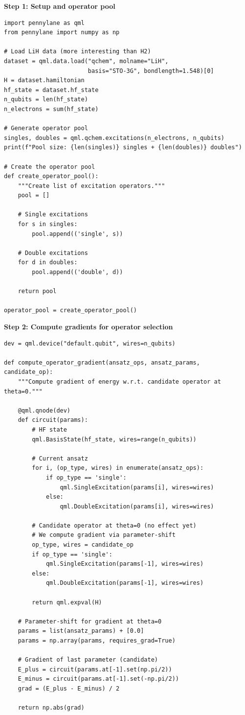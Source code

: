 \documentclass[11pt,a4paper]{article}
\begin{document}
\textbf{Step 1: Setup and operator pool}
\begin{lstlisting}
import pennylane as qml
from pennylane import numpy as np

# Load LiH data (more interesting than H2)
dataset = qml.data.load("qchem", molname="LiH",
                        basis="STO-3G", bondlength=1.548)[0]
H = dataset.hamiltonian
hf_state = dataset.hf_state
n_qubits = len(hf_state)
n_electrons = sum(hf_state)

# Generate operator pool
singles, doubles = qml.qchem.excitations(n_electrons, n_qubits)
print(f"Pool size: {len(singles)} singles + {len(doubles)} doubles")

# Create the operator pool
def create_operator_pool():
    """Create list of excitation operators."""
    pool = []
    
    # Single excitations
    for s in singles:
        pool.append(('single', s))
    
    # Double excitations
    for d in doubles:
        pool.append(('double', d))
    
    return pool

operator_pool = create_operator_pool()
\end{lstlisting}

\textbf{Step 2: Compute gradients for operator selection}
\begin{lstlisting}
dev = qml.device("default.qubit", wires=n_qubits)

def compute_operator_gradient(ansatz_ops, ansatz_params, candidate_op):
    """Compute gradient of energy w.r.t. candidate operator at theta=0."""
    
    @qml.qnode(dev)
    def circuit(params):
        # HF state
        qml.BasisState(hf_state, wires=range(n_qubits))
        
        # Current ansatz
        for i, (op_type, wires) in enumerate(ansatz_ops):
            if op_type == 'single':
                qml.SingleExcitation(params[i], wires=wires)
            else:
                qml.DoubleExcitation(params[i], wires=wires)
        
        # Candidate operator at theta=0 (no effect yet)
        # We compute gradient via parameter-shift
        op_type, wires = candidate_op
        if op_type == 'single':
            qml.SingleExcitation(params[-1], wires=wires)
        else:
            qml.DoubleExcitation(params[-1], wires=wires)
        
        return qml.expval(H)
    
    # Parameter-shift for gradient at theta=0
    params = list(ansatz_params) + [0.0]
    params = np.array(params, requires_grad=True)
    
    # Gradient of last parameter (candidate)
    E_plus = circuit(params.at[-1].set(np.pi/2))
    E_minus = circuit(params.at[-1].set(-np.pi/2))
    grad = (E_plus - E_minus) / 2
    
    return np.abs(grad)
\end{lstlisting}
\end{document}
